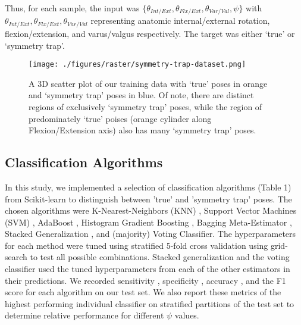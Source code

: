 Thus, for each sample, the input was $\{\theta_{Int/Ext}, \theta_{Flx/Ext}, \theta_{Var/Val}, \psi\}$ with $\theta_{Int/Ext}, \theta_{Flx/Ext}, \theta_{Var/Val}$ representing anatomic internal/external rotation, flexion/extension, and varus/valgus respectively. The target was either `true' or `symmetry trap'.

\begin{figure}[h!]
  \centering
  \texttt{[image: ./figures/raster/symmetry-trap-dataset.png]}
  \caption{A 3D scatter plot of our training data with `true' poses in orange and `symmetry trap' poses in blue. Of note, there are distinct regions of exclusively `symmetry trap' poses, while the region of predominately `true' poises (orange cylinder along Flexion/Extension axis) also has many `symmetry trap' poses.}
  \label{fig:sym-trap-dataset}
\end{figure}
\subsection{Classification Algorithms}
In this study, we implemented a selection of classification algorithms (Table 1) from Scikit-learn \cite{scikit-learn} to distinguish between 'true' and 'symmetry trap' poses.
The chosen algorithms were K-Nearest-Neighbors (KNN) \cite{fixDiscriminatoryAnalysisNanparametric1951},
Support Vector Machines (SVM) \cite{cortesSupportvectorNetworks1995}, AdaBoost \cite{friedmanGreedyFunctionApproximation2001},
Histogram Gradient Boosting \cite{freundDecisionTheoreticGeneralizationOnLine1997},
Bagging Meta-Estimator \cite{breimanBaggingPredictors1996},
Stacked Generalization \cite{smythLinearlyCombiningDensity1999,wolpertStackedGeneralization1992},
and (majority) Voting Classifier.
The hyperparameters for each method were tuned using stratified 5-fold cross validation using grid-search to test all possible combinations.
Stacked generalization and the voting classifier used the tuned hyperparameters from each of the other estimators in their predictions.
We recorded sensitivity \cite{yerushalmyStatisticalProblemsAssessing1947}, specificity \cite{yerushalmyStatisticalProblemsAssessing1947}, accuracy \cite{internationalorganizationforstandardizationAccuracyTruenessPrecision2023},
and the F1 score \cite{tahaMetricsEvaluating3D2015} for each algorithm on our test set.
We also report these metrics of the highest performing individual classifier on stratified partitions of the test set to determine relative performance for different $\psi$ values.


